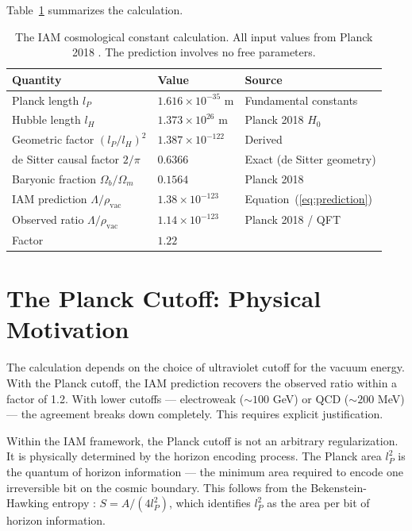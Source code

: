 \documentclass[12pt,a4paper]{article}
\begin{document}
Table~\ref{tab:summary} summarizes the calculation.

\begin{table}[!htbp]
\centering
\caption{The IAM cosmological constant calculation. All input values from
Planck 2018 \citep{planck2020}. The prediction involves no free
parameters.}
\label{tab:summary}
\begin{tabular}{lll}
\toprule
Quantity & Value & Source \\
\midrule
Planck length $l_P$ & $1.616 \times 10^{-35}$ m & Fundamental constants \\
Hubble length $l_H$ & $1.373 \times 10^{26}$ m & Planck 2018 $H_0$ \\
Geometric factor $(l_P/l_H)^2$ & $1.387 \times 10^{-122}$ & Derived \\
de Sitter causal factor $2/\pi$ & $0.6366$ & Exact (de Sitter geometry) \\
Baryonic fraction $\Omega_b/\Omega_m$ & $0.1564$ & Planck 2018 \\
IAM prediction $\Lambda/\rho_\mathrm{vac}$ & $1.38 \times 10^{-123}$ &
Equation~(\ref{eq:prediction}) \\
Observed ratio $\Lambda/\rho_\mathrm{vac}$ & $1.14 \times 10^{-123}$ &
Planck 2018 / QFT \\
Factor & $1.22$ & \\
\bottomrule
\end{tabular}
\end{table}

\section{The Planck Cutoff: Physical Motivation}
\label{sec:planck}

The calculation depends on the choice of ultraviolet cutoff for the
vacuum energy. With the Planck cutoff, the IAM prediction recovers the
observed ratio within a factor of 1.2. With lower cutoffs — electroweak
($\sim 100$ GeV) or QCD ($\sim 200$ MeV) — the agreement breaks down
completely. This requires explicit justification.

Within the IAM framework, the Planck cutoff is not an arbitrary
regularization. It is physically determined by the horizon encoding
process. The Planck area $l_P^2$ is the quantum of horizon information —
the minimum area required to encode one irreversible bit on the cosmic
boundary. This follows from the Bekenstein-Hawking entropy
\citep{bekenstein1973,hawking1975}: $S = A/(4l_P^2)$, which identifies
$l_P^2$ as the area per bit of horizon information.
\end{document}
